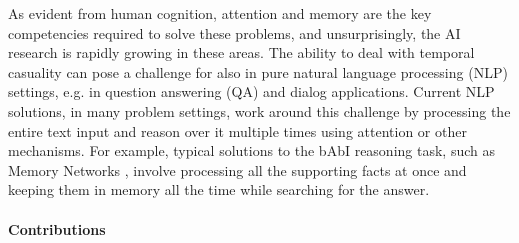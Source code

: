 As evident from human cognition, attention and memory are the key competencies required to solve these problems, and unsurprisingly, the AI research is rapidly growing in these areas.
The ability to deal with temporal casuality can pose a challenge for also in pure natural language processing (NLP) settings, e.g. in question answering (QA) and dialog applications.  
Current NLP solutions, in many problem settings, work around this challenge by processing the entire text input and reason over it multiple times using attention \cite{vaswani2017attention} or other mechanisms.
For example, typical solutions to the bAbI reasoning task, such as Memory Networks \cite{weston2014memory}, involve processing all the supporting facts at once and keeping them in memory all the time while searching for the answer.


\paragraph{Contributions}
